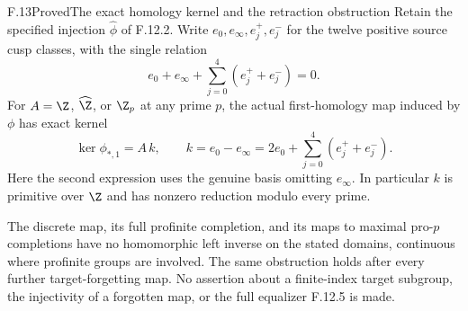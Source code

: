 \begin{claim}{F.13}{Proved}{The exact homology kernel and the retraction obstruction}
Retain the specified injection
$\widehat\phi$ of F.12.2.  Write $e_0,e_\infty,e_j^+,e_j^-$
for the twelve positive source cusp classes, with the
single relation
\[
 e_0+e_\infty+\sum_{j=0}^4(e_j^++e_j^-)=0.
                                                               \tag{F.13.1}
\]
For $A=\Z$, $\widehat\Z$, or $\Z_p$ at any prime $p$,
the actual first-homology map induced by $\phi$ has exact
kernel
\[
 \ker\phi_{*,1}
   =A\,k,\qquad
 k=e_0-e_\infty
   =2e_0+\sum_{j=0}^4(e_j^++e_j^-).
                                                               \tag{F.13.2}
\]
Here the second expression uses the genuine basis
omitting $e_\infty$.  In particular $k$ is primitive
over $\Z$ and has nonzero reduction modulo every prime.

The discrete map, its full profinite completion, and its
maps to maximal pro-$p$ completions have no homomorphic
left inverse on the stated domains, continuous where
profinite groups are involved.  The same obstruction
holds after every further target-forgetting map.
No assertion about a finite-index target subgroup, the
injectivity of a forgotten map, or the full equalizer
F.12.5 is made.
\end{claim}
